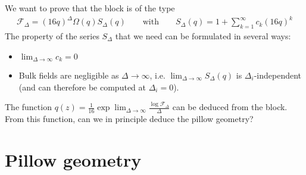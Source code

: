 \documentclass[12pt,a4paper]{article}
\begin{document}
We want to prove that the block is of the type 
\begin{align}
 \mathcal{F}_\Delta = (16q)^\Delta \Omega(q)S_\Delta(q) \qquad \text{with} \qquad S_\Delta(q) =  1 + \sum_{k=1}^\infty c_k (16q)^k 
 \label{fd}
\end{align}
The property of the series $S_\Delta$ that we need can be formulated in several ways:
\begin{itemize}
 \item $\lim_{\Delta\to \infty} c_k = 0$
 \item Bulk fields are negligible as $\Delta\to\infty$, i.e. $\lim_{\Delta\to\infty} S_\Delta(q)$ is $\Delta_i$-independent (and can therefore be computed at $\Delta_i=0$). 
\end{itemize}
The function $q(z)= \frac{1}{16} \exp \lim_{\Delta\to \infty} \frac{\log \mathcal{F}_\Delta}{\Delta}$ can be deduced from the block. From this function, can we in principle deduce the pillow geometry?


\section{Pillow geometry}
\end{document}
